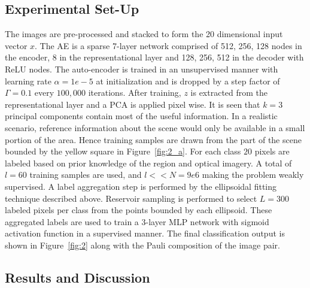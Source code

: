 \subsection{Experimental Set-Up}
\label{sec:result}
The images are pre-processed and stacked to form the 20 dimensional input vector $x$.  The AE is a sparse 7-layer network comprised of 512, 256, 128 nodes in the encoder, 8 in the representational layer and 128, 256, 512 in the decoder with ReLU nodes. The auto-encoder is trained in an unsupervised manner with learning rate $\alpha=1e-5$ at initialization and is dropped by a step factor of $\Gamma=0.1$ every $100,000$ iterations.  After training,  $z$ is extracted from the representational layer and a PCA is applied pixel wise. It is seen that $k=3$ principal components contain most of the useful information.
In a realistic scenario, reference information about the scene would only be available in a small portion of the area. Hence training samples are drawn from the part of the scene bounded by the yellow square in Figure~\ref{fig:2_a}. For each class $20$ pixels are labeled based on prior knowledge of the region and optical imagery. A total of $l=60$ training samples are  used, and $l<<N=9e6$ making the problem weakly supervised. A label aggregation step is performed by the ellipsoidal fitting technique described above. Reservoir sampling is performed to select $L=300$ labeled pixels per class from the points bounded by each ellipsoid. These aggregated labels are used to train a 3-layer MLP network with sigmoid activation function in a supervised manner. The final classification output   is shown in Figure~\ref{fig:2} along with the Pauli composition of the image pair. %

\subsection{Results and Discussion}

